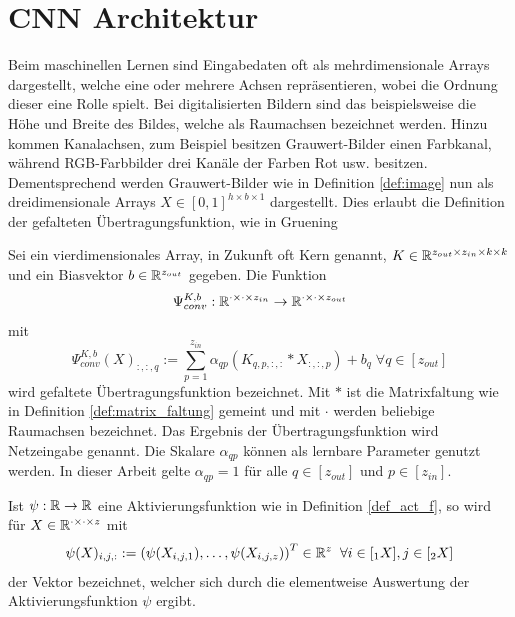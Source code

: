 \section{CNN Architektur}
\label{abs:CNN_arch}
Beim maschinellen Lernen sind Eingabedaten oft als mehrdimensionale Arrays dargestellt, welche eine oder mehrere Achsen repräsentieren, wobei die Ordnung dieser eine Rolle spielt. Bei digitalisierten Bildern sind das beispielsweise die Höhe und Breite des Bildes, welche als Raumachsen bezeichnet werden. Hinzu kommen Kanalachsen, zum Beispiel besitzen Grauwert-Bilder einen Farbkanal, während RGB-Farbbilder drei Kanäle der Farben Rot usw. besitzen. Dementsprechend werden Grauwert-Bilder wie in Definition \ref{def:image} nun als dreidimensionale Arrays $X \in [0,1]^{h \times b \times 1}$ dargestellt. Dies erlaubt die Definition der gefalteten Übertragungsfunktion, wie in Gruening \cite{gruening}

\begin{defi}
    \label{eq:convlogit}
    Sei ein vierdimensionales Array, in Zukunft oft Kern genannt, $K \in \mathbb{R}^{z_{out} \times z_{in} \times k \times k}$ und ein Biasvektor $b \in \mathbb{R}^{z_{out}}$ gegeben. Die Funktion 
    \begin{equation*}
        \Psi_{conv}^{K,b}: \mathbb{R}^{\cdot \times \cdot \times z_{in}} \rightarrow \mathbb{R}^{\cdot \times \cdot\times z_{out}}
    \end{equation*}
    mit
    \begin{equation*}
        \Psi_{conv}^{K,b}(X)_{:,:,q}:= \sum_{p=1}^{z_{in}} \alpha_{qp} \left(K_{q,p,:,:} \ast X_{:,:,p} \right) +b_q \; \forall q \in [z_{out}]
    \end{equation*}
    wird gefaltete Übertragungsfunktion bezeichnet. Mit $\ast$ ist die Matrixfaltung wie in Definition \ref{def:matrix_faltung} gemeint und mit $\cdot$ werden beliebige Raumachsen bezeichnet. Das Ergebnis der Übertragungsfunktion wird Netzeingabe genannt. Die Skalare $\alpha_{qp}$ können als lernbare Parameter genutzt werden. In dieser Arbeit gelte $\alpha_{qp}=1$ für alle $q \in [z_{out}]$ und $p \in [z_{in}]$.
\end{defi}


\begin{bem}
    Ist $\psi: \mathbb{R} \rightarrow \mathbb{R}$ eine Aktivierungsfunktion wie in Definition \ref{def_act_f}, so wird für $X \in \mathbb{R}^{\cdot \times \cdot \times z}$ mit 
    \[\psi(X)_{i,j,:}:=\left(\psi(X_{i,j,1}), \ldots, \psi(X_{i,j,z})\right)^T \in \mathbb{R}^z \; \; \forall i \in [{}_1 X], j \in [{}_2 X] 
    \]
    der Vektor bezeichnet, welcher sich durch die elementweise Auswertung der Aktivierungsfunktion $\psi$ ergibt.
\end{bem}

